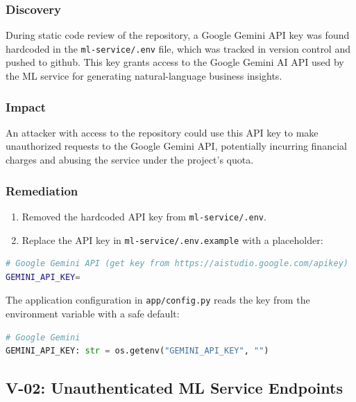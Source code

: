\documentclass[12pt,a4paper]{article}
\begin{document}
\subsubsection{Discovery}

During static code review of the repository, a Google Gemini API key was found hardcoded in the \texttt{ml-service/.env} file, which was tracked in version control and pushed to github. This key grants access to the Google Gemini AI API used by the ML service for generating natural-language business insights.

\subsubsection{Impact}

An attacker with access to the repository could use this API key to make unauthorized requests to the Google Gemini API, potentially incurring financial charges and abusing the service under the project's quota.

\subsubsection{Remediation}

\begin{enumerate}
  \item Removed the hardcoded API key from \texttt{ml-service/.env}.
  \item Replace the API key in \texttt{ml-service/.env.example} with a placeholder:
\end{enumerate}

\begin{lstlisting}[language=bash, caption={ml-service/.env.example -- API key placeholder}]
# Google Gemini API (get key from https://aistudio.google.com/apikey)
GEMINI_API_KEY=
\end{lstlisting}

The application configuration in \texttt{app/config.py} reads the key from the environment variable with a safe default:

\begin{lstlisting}[language=Python, caption={app/config.py -- Safe API key loading}]
# Google Gemini
GEMINI_API_KEY: str = os.getenv("GEMINI_API_KEY", "")
\end{lstlisting}

\subsection{V-02: Unauthenticated ML Service Endpoints}
\end{document}
